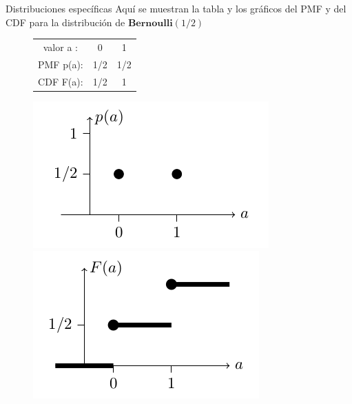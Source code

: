\documentclass[10pt]{beamer}
\begin{document}
\begin{frame}{Distribuciones espec\'ificas}
Aqu\'i se muestran  la tabla y los gr\'aficos del PMF y del CDF para la distribuci\'on de $\textbf{Bernoulli} (1/2)$ 

\begin{figure}
	\centering
	\begin{minipage}{.5\textwidth}
	\begin{table}[]
		\centering
		\begin{tabular}{ccc}
			valor  a  :    & 0    & 1    \\
			PMF   p(a): & 1/2 & 1/2     \\
			CDF   F(a):& 1/2  &  1	
		\end{tabular}
	\end{table}
	\end{minipage}%
	\begin{minipage}{.3\textwidth}
		\centering
		\includegraphics[width=1.2\linewidth]{v9}
	\end{minipage}
		\begin{minipage}{.3\textwidth}
			\centering
			\includegraphics[width=1.2\linewidth]{v10}
		\end{minipage}
\end{figure}

\end{frame}
\end{document}
